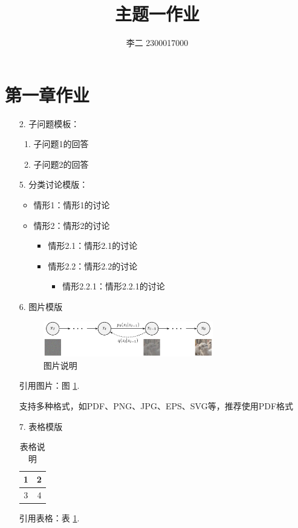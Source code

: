 \documentclass{ctexart}
\title{\bfseries 主题一作业}
\author{李二 2300017000}
\begin{document}
\maketitle

\section{第一章作业}

\begin{enumerate}[wide, labelindent=0pt]
\item[2.] 子问题模板：
\begin{enumerate}
\item 子问题1的回答
\item 子问题2的回答
\end{enumerate}

\item[5.] 分类讨论模版：
\begin{itemize}
    \item 情形1：情形1的讨论
    \item 情形2：情形2的讨论
    \begin{itemize}
        \item 情形2.1：情形2.1的讨论
        \item 情形2.2：情形2.2的讨论
        \begin{itemize}
            \item 情形2.2.1：情形2.2.1的讨论
        \end{itemize}
    \end{itemize}
\end{itemize}

\item[6.] 图片模版
\begin{figure}[ht]
    \centering
    \includegraphics[width=0.7\textwidth]{example-image-a.pdf}
    \caption{图片说明}\label{fig:example}
\end{figure}
引用图片：图 \ref{fig:example}. 

支持多种格式，如PDF、PNG、JPG、EPS、SVG等，推荐使用PDF格式

\item[7.] 表格模版
\begin{table}[H]
    \centering
    \begin{tabular}{|c|c|}
        \hline
        1 & 2 \\
        \hline
        3 & 4 \\
        \hline
    \end{tabular}
    \caption{表格说明}\label{tab:example}
\end{table}
引用表格：表 \ref{tab:example}. 


\end{enumerate}
\end{document}
